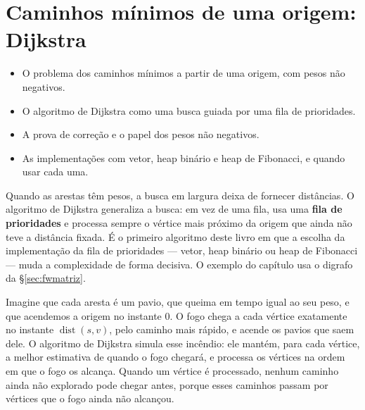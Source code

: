\chapter{Caminhos mínimos de uma origem: Dijkstra}\label{cap:dijkstra}\label{sec:dijkstra}
\begin{objetivos}
\begin{itemize}
  \item O problema dos caminhos mínimos a partir de uma origem, com pesos não negativos.
  \item O algoritmo de Dijkstra como uma busca guiada por uma fila de prioridades.
  \item A prova de correção e o papel dos pesos não negativos.
  \item As implementações com vetor, heap binário e heap de Fibonacci, e quando usar cada uma.
\end{itemize}
\end{objetivos}

Quando as arestas têm pesos, a busca em largura deixa de fornecer distâncias. O algoritmo de Dijkstra generaliza a busca: em vez de uma fila, usa uma \textbf{fila de prioridades} e processa sempre o vértice mais próximo da origem que ainda não teve a distância fixada. É o primeiro algoritmo deste livro em que a escolha da implementação da fila de prioridades --- vetor, heap binário ou heap de Fibonacci --- muda a complexidade de forma decisiva. O exemplo do capítulo usa o digrafo da §\ref{sec:fwmatriz}.

\begin{intuicao}
Imagine que cada aresta é um pavio, que queima em tempo igual ao seu peso, e que acendemos a origem no instante 0. O fogo chega a cada vértice exatamente no instante $\operatorname{dist}(s,v)$, pelo caminho mais rápido, e acende os pavios que saem dele. O algoritmo de Dijkstra simula esse incêndio: ele mantém, para cada vértice, a melhor estimativa de quando o fogo chegará, e processa os vértices na ordem em que o fogo os alcança. Quando um vértice é processado, nenhum caminho ainda não explorado pode chegar antes, porque esses caminhos passam por vértices que o fogo ainda não alcançou.
\end{intuicao}

